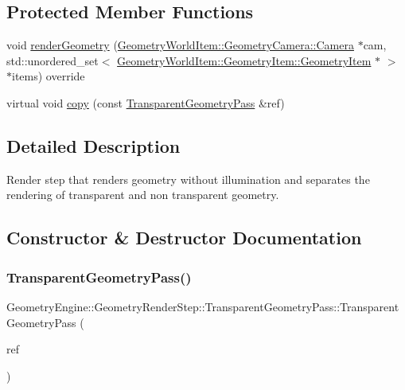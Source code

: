 \subsection*{Protected Member Functions}
\begin{DoxyCompactItemize}
\item 
void \mbox{\hyperlink{class_geometry_engine_1_1_geometry_render_step_1_1_transparent_geometry_pass_a22bae026c0e006318d5ab21bdaeeb247}{render\+Geometry}} (\mbox{\hyperlink{class_geometry_engine_1_1_geometry_world_item_1_1_geometry_camera_1_1_camera}{Geometry\+World\+Item\+::\+Geometry\+Camera\+::\+Camera}} $\ast$cam, std\+::unordered\+\_\+set$<$ \mbox{\hyperlink{class_geometry_engine_1_1_geometry_world_item_1_1_geometry_item_1_1_geometry_item}{Geometry\+World\+Item\+::\+Geometry\+Item\+::\+Geometry\+Item}} $\ast$ $>$ $\ast$items) override
\item 
virtual void \mbox{\hyperlink{class_geometry_engine_1_1_geometry_render_step_1_1_transparent_geometry_pass_a4f8821d67b06746fa1c1aba1f70e1b83}{copy}} (const \mbox{\hyperlink{class_geometry_engine_1_1_geometry_render_step_1_1_transparent_geometry_pass}{Transparent\+Geometry\+Pass}} \&ref)
\end{DoxyCompactItemize}


\subsection{Detailed Description}
Render step that renders geometry without illumination and separates the rendering of transparent and non transparent geometry. 

\subsection{Constructor \& Destructor Documentation}
\mbox{\label{class_geometry_engine_1_1_geometry_render_step_1_1_transparent_geometry_pass_a345a08ae0ee85a990f56f8e943a4e22d}} 
\subsubsection{\texorpdfstring{TransparentGeometryPass()}{TransparentGeometryPass()}}
{\footnotesize\ttfamily Geometry\+Engine\+::\+Geometry\+Render\+Step\+::\+Transparent\+Geometry\+Pass\+::\+Transparent\+Geometry\+Pass (\begin{DoxyParamCaption}\item[{const \mbox{\hyperlink{class_geometry_engine_1_1_geometry_render_step_1_1_transparent_geometry_pass}{Transparent\+Geometry\+Pass}} \&}]{ref }\end{DoxyParamCaption})\hspace{0.3cm}{\ttfamily [inline]}}


